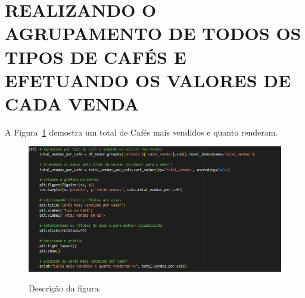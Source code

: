 \section{REALIZANDO O  AGRUPAMENTO DE TODOS OS TIPOS DE CAFÉS E EFETUANDO OS VALORES DE CADA VENDA}
	\label{sec:identificao}
\label{sec:figura}
A Figura~\ref{figuras/configuraçao-somando-todos-cafes-valores-vendas.png} demostra um total de Cafés mais vendidos e quanto renderam.
\begin{figure}[!ht]
	{\centering
		\caption{Descrição da figura.}
		\includegraphics[width=1.0\textwidth]{figuras/configuraçao-somando-todos-cafes-valores-vendas.png}
		\label{figuras/configuraçao-somando-todos-cafes-valores-vendas.png}
	}
\end{figure} \\ \\ \\ \\ \\ \\ \\  \\ \\ \\ \\ \\ 

